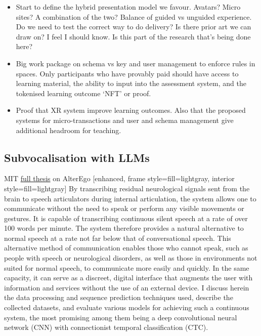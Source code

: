 \begin{itemize}
\item Start to define the hybrid presentation model we favour. Avatars? Micro sites? A combination of the two? Balance of guided vs unguided experience. Do we need to test the correct way to do delivery? Is there prior art we can draw on? I feel I should know. Is this part of the research that's being done here?
\item Big work package on schema vs key and user management to enforce rules in spaces. Only participants who have provably paid should have access to learning material, the ability to input into the assessment system, and the tokenised learning outcome `NFT' or proof.
\item Proof that XR system improve learning outcomes. Also that the proposed systems for micro-transactions and user and schema management give additional headroom for teaching.
\end{itemize}
\subsection{Subvocalisation with LLMs}
MIT \href{https://dspace.mit.edu/handle/1721.1/123121}{full thesis} on AlterEgo
[enhanced, frame style={fill=lightgray}, interior style={fill=lightgray}]
By transcribing residual neurological signals sent from the brain to speech articulators during internal articulation, the system allows one to communicate without the need to speak or perform any visible movements or gestures. It is capable of transcribing continuous silent speech at a rate of over 100 words per minute. The system therefore provides a natural alternative to normal speech at a rate not far below that of conversational speech. This alternative method of communication enables those who cannot speak, such as people with speech or neurological disorders, as well as those in environments not suited for normal speech, to communicate more easily and quickly. In the same capacity, it can serve as a discreet, digital interface that augments the user with information and services without the use of an external device. I discuss herein the data processing and sequence prediction techniques used, describe the collected datasets, and evaluate various models for achieving such a continuous system, the most promising among them being a deep convolutional neural network (CNN) with connectionist temporal classification (CTC).
